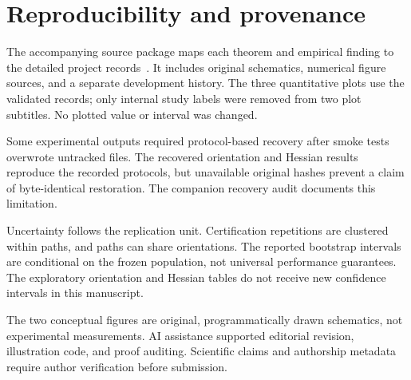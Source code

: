 \section{Reproducibility and provenance}\label{sec:record}
The accompanying source package maps each theorem and empirical finding to
the detailed project records~\cite{project2026}. It includes original
schematics, numerical figure sources, and a separate development history.
The three quantitative plots use the validated records; only internal study
labels were removed from two plot subtitles. No plotted value or interval
was changed.

Some experimental outputs required protocol-based recovery after smoke
tests overwrote untracked files. The recovered orientation and Hessian
results reproduce the recorded protocols, but unavailable original hashes
prevent a claim of byte-identical restoration. The companion recovery audit
documents this limitation.

Uncertainty follows the replication unit. Certification repetitions are
clustered within paths, and paths can share orientations. The reported
bootstrap intervals are conditional on the frozen population, not universal
performance guarantees. The exploratory orientation and Hessian tables do
not receive new confidence intervals in this manuscript.

The two conceptual figures are original, programmatically drawn schematics,
not experimental measurements. AI assistance supported editorial revision,
illustration code, and proof auditing. Scientific claims and authorship
metadata require author verification before submission.
